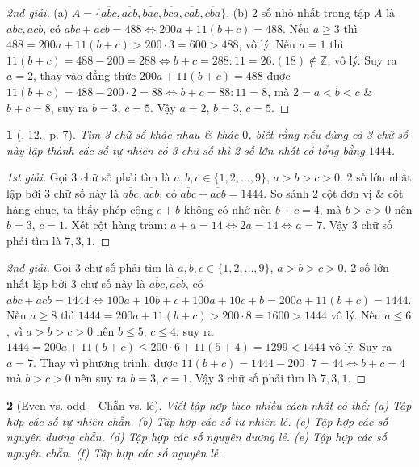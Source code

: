 \documentclass{article}
\newtheorem{baitoan}{}
\begin{document}
\begin{proof}[2nd giải]
	(a) $A = \{\overline{abc},\overline{acb},\overline{bac},\overline{bca},\overline{cab},\overline{cba}\}$. (b) 2 số nhỏ nhất trong tập $A$ là $\overline{abc},\overline{acb}$, có $\overline{abc} + \overline{acb} = 488\Leftrightarrow200a + 11(b + c) = 488$. Nếu $a\ge3$ thì $488 = 200a + 11(b + c) > 200\cdot3 = 600 > 488$, vô lý. Nếu $a = 1$ thì $11(b + c) = 488 - 200 = 288\Leftrightarrow b + c = 288:11 = 26.(18)\notin\mathbb{Z}$, vô lý. Suy ra $a = 2$, thay vào đẳng thức $200a + 11(b + c) = 488$ được $11(b + c) = 488 - 200\cdot2 = 88\Leftrightarrow b + c = 88:11 = 8$, mà $2 = a < b < c$ \& $b + c = 8$, suy ra $b = 3$, $c = 5$. Vậy $a = 2$, $b = 3$, $c = 5$.
\end{proof}

\begin{baitoan}[\cite{Binh_Toan_6_tap_1}, 12., p. 7]
	Tìm 3 chữ số khác nhau \& khác $0$, biết rằng nếu dùng cả 3 chữ số này lập thành các số tự nhiên có 3 chữ số thì 2 số lớn nhất có tổng bằng $1444$.
\end{baitoan}

\begin{proof}[1st giải]
	Gọi 3 chữ số phải tìm là $a,b,c\in\{1,2,\ldots,9\}$, $a > b > c > 0$. 2 số lớn nhất lập bởi 3 chữ số này là $\overline{abc},\overline{acb}$, có $\overline{abc} + \overline{acb} = 1444$. So sánh 2 cột đơn vị \& cột hàng chục, ta thấy phép cộng $c + b$ không có nhớ nên $b + c = 4$, mà $b > c > 0$ nên $b = 3$, $c = 1$. Xét cột hàng trăm: $a + a  = 14\Leftrightarrow2a = 14\Leftrightarrow a = 7$. Vậy 3 chữ số phải tìm là $7,3,1$.
\end{proof}

\begin{proof}[2nd giải]
	Gọi 3 chữ số phải tìm là $a,b,c\in\{1,2,\ldots,9\}$, $a > b > c > 0$. 2 số lớn nhất lập bởi 3 chữ số này là $\overline{abc},\overline{acb}$, có $\overline{abc} + \overline{acb} = 1444\Leftrightarrow100a + 10b + c + 100a + 10c + b = 200a + 11(b + c) = 1444$. Nếu $a\ge8$ thì $1444 = 200a + 11(b + c) > 200\cdot8 = 1600 > 1444$ vô lý. Nếu $a\le6$, vì $a > b > c > 0$ nên $b\le5$, $c\le4$, suy ra $1444 = 200a + 11(b + c)\le200\cdot6 + 11(5 + 4) = 1299 < 1444$ vô lý. Suy ra $a = 7$. Thay vì phương trình, được $11(b + c) = 1444 - 200\cdot7 = 44\Leftrightarrow b + c = 4$ mà $b > c > 0$ nên suy ra $b = 3$, $c = 1$. Vậy 3 chữ số phải tìm là $7,3,1$.
\end{proof}

\begin{baitoan}[Even vs. odd -- Chẵn vs. lẻ]
	Viết tập hợp theo nhiều cách nhất có thể: (a) Tập hợp các số tự nhiên chẵn. (b) Tập hợp các số tự nhiên lẻ. (c) Tập hợp các số nguyên dương chẵn. (d) Tập hợp các số nguyên dương lẻ. (e) Tập hợp các số nguyên chẵn. (f) Tập hợp các số nguyên lẻ.
\end{baitoan}
\end{document}
